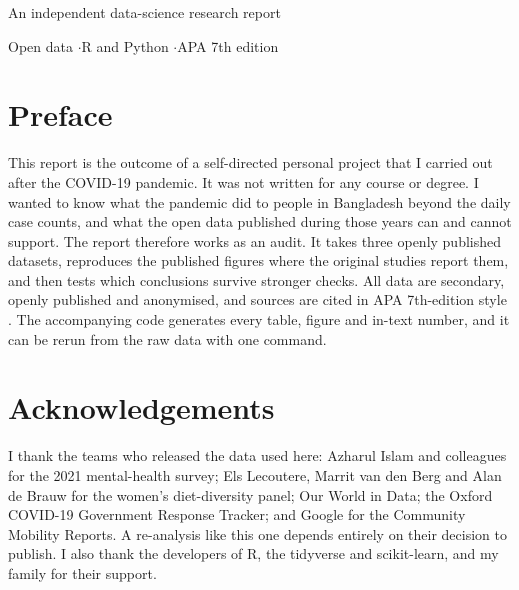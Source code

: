 \hypersetup{pageanchor=false}
\begin{titlepage}
\centering
\vspace*{2.5cm}
{\LARGE\bfseries \ProjectTitle\par}
\vspace{0.6cm}
{\large\itshape \ProjectSubtitle\par}
\vspace{2.2cm}
{\normalsize An independent data-science research report\par}
\vspace{2.2cm}
{\Large \AuthorName\par}
\vspace{0.3cm}
{\normalsize \AuthorDegree\par}
{\normalsize \AuthorAffiliation\par}
\ifx\AuthorContact\empty\else\vspace{0.3cm}{\normalsize\url{\AuthorContact}\par}\fi
\vfill
{\small Open data \quad$\cdot$\quad R and Python \quad$\cdot$\quad APA 7th edition\par}
\vspace{0.6cm}
{\normalsize \ReportDate\par}
\end{titlepage}
\hypersetup{pageanchor=true}

\chapter*{Preface}
This report is the outcome of a self-directed personal project that I carried out after the COVID-19 pandemic. It was not written for any course or degree. I wanted to know what the pandemic did to people in Bangladesh beyond the daily case counts, and what the open data published during those years can and cannot support. The report therefore works as an audit. It takes three openly published datasets, reproduces the published figures where the original studies report them, and then tests which conclusions survive stronger checks. All data are secondary, openly published and anonymised, and sources are cited in APA 7th-edition style \parencite{apa2020}. The accompanying code generates every table, figure and in-text number, and it can be rerun from the raw data with one command.

\chapter*{Acknowledgements}
I thank the teams who released the data used here: Azharul Islam and colleagues for the 2021 mental-health survey; Els Lecoutere, Marrit van den Berg and Alan de Brauw for the women's diet-diversity panel; Our World in Data; the Oxford COVID-19 Government Response Tracker; and Google for the Community Mobility Reports. A re-analysis like this one depends entirely on their decision to publish. I also thank the developers of R, the tidyverse and scikit-learn, and my family for their support.

